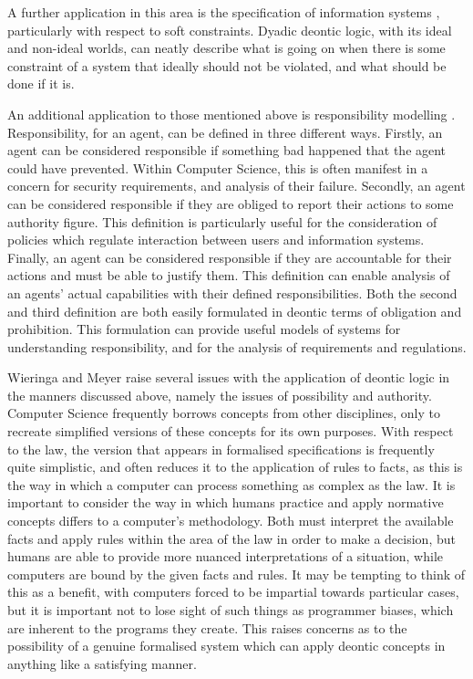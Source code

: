 \documentclass{l4proj}
\begin{document}
A further application in this area is the specification of information systems \cite{infosystems}, particularly with respect to soft constraints. Dyadic deontic logic, with its ideal and non-ideal worlds, can neatly describe what is going on when there is some constraint of a system that ideally should not be violated, and what should be done if it is. 

An additional application to those mentioned above is responsibility modelling \cite{responsibility}. Responsibility, for an agent, can be defined in three different ways. Firstly, an agent can be considered responsible if something bad happened that the agent could have prevented. Within Computer Science, this is often manifest in a concern for security requirements, and analysis of their failure. Secondly, an agent can be considered responsible if they are obliged to report their actions to some authority figure. This definition is particularly useful for the consideration of policies which regulate interaction between users and information systems. Finally, an agent can be considered responsible if they are accountable for their actions and must be able to justify them. This definition can enable analysis of an agents' actual capabilities with their defined responsibilities. Both the second and third definition are both easily formulated in deontic terms of obligation and prohibition. This formulation can provide useful models of systems for understanding responsibility, and for the analysis of requirements and regulations. 

Wieringa and Meyer raise several issues with the application of deontic logic in the manners discussed above, namely the issues of possibility and authority. Computer Science frequently borrows concepts from other disciplines, only to recreate simplified versions of these concepts for its own purposes. With respect to the law, the version that appears in formalised specifications is frequently quite simplistic, and often reduces it to the application of rules to facts, as this is the way in which a computer can process something as complex as the law. It is important to consider the way in which humans practice and apply normative concepts differs to a computer's methodology. Both must interpret the available facts and apply rules within the area of the law in order to make a decision, but humans are able to provide more nuanced interpretations of a situation, while computers are bound by the given facts and rules. It may be tempting to think of this as a benefit, with computers forced to be impartial towards particular cases, but it is important not to lose sight of such things as programmer biases, which are inherent to the programs they create. This raises concerns as to the possibility of a genuine formalised system which can apply deontic concepts in anything like a satisfying manner. 
\end{document}
